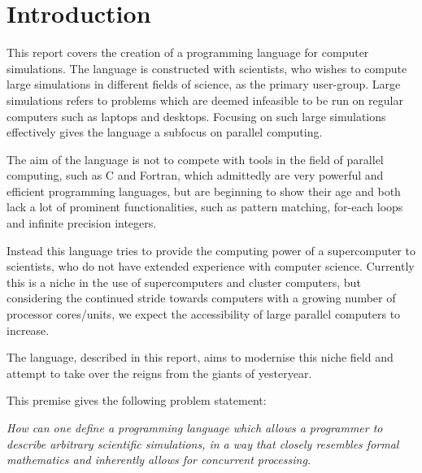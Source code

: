 \chapter{Introduction}\label{part:introduction}

This report covers the creation of a programming language for computer simulations. The language is constructed with scientists, who wishes to compute large simulations in different fields of science, as the primary user-group. Large simulations refers to problems which are deemed infeasible to be run on regular computers such as laptops and desktops. Focusing on such large simulations effectively gives the language a subfocus on parallel computing.

The aim of the language is not to compete with tools in the field of parallel computing, such as C and Fortran, which admittedly are very powerful and efficient programming languages, but are beginning to show their age and both lack a lot of prominent functionalities, such as pattern matching, for-each loops and infinite precision integers. 

Instead this language tries to provide the computing power of a supercomputer to scientists, who do not have extended experience with computer science. Currently this is a niche in the use of supercomputers and cluster computers, but considering the continued stride towards computers with a growing number of processor cores/units, we expect the accessibility of large parallel computers to increase. 

The language, described in this report, aims to modernise this niche field and attempt to take over the reigns from the giants of yesteryear.

This premise gives the following problem statement:

\emph{How can one define a programming language which allows a programmer to describe arbitrary scientific simulations, in a way that closely resembles formal mathematics and inherently allows for concurrent processing.}